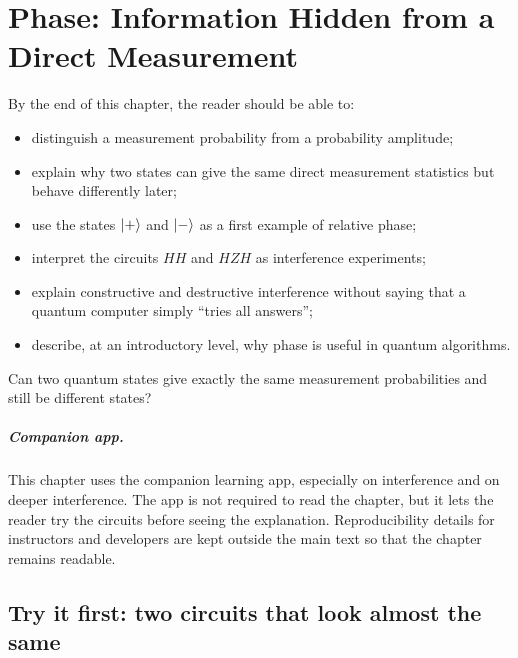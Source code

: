 \chapter[Phase and Interference]{Phase: Information Hidden from a Direct Measurement}
\label{chap:phase}

\begin{learningobjectives}
By the end of this chapter, the reader should be able to:
\begin{itemize}
  \item distinguish a measurement probability from a probability amplitude;
  \item explain why two states can give the same direct measurement statistics but behave differently later;
  \item use the states $\lvert +\rangle$ and $\lvert -\rangle$ as a first example of relative phase;
  \item interpret the circuits $H H$ and $H Z H$ as interference experiments;
  \item explain constructive and destructive interference without saying that a quantum computer simply ``tries all answers'';
  \item describe, at an introductory level, why phase is useful in quantum algorithms.
\end{itemize}
\end{learningobjectives}

\begin{openingquestion}
Can two quantum states give exactly the same measurement probabilities and still be different states?
\end{openingquestion}

\paragraph{Companion app.}
This chapter uses the companion learning app, especially  on interference and  on deeper interference. The app is not required to read the chapter, but it lets the reader try the circuits before seeing the explanation. Reproducibility details for instructors and developers are kept outside the main text so that the chapter remains readable.

\section{Try it first: two circuits that look almost the same}
\label{sec:ch06-try-first}

